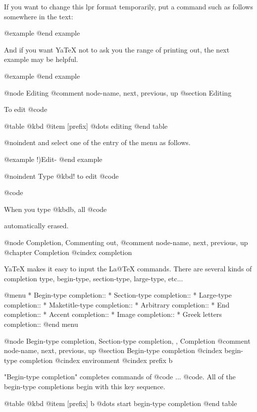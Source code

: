 {{{{{{{{{{{{{{{{{  If you want to change this lpr format temporarily, put a command
such as follows somewhere in the text:

@example
@end example

  And if you want YaTeX not to ask you the range of printing
out, the next example may be helpful.

@example
@end example

@node Editing %
@comment  node-name,  next,  previous,  up
@section Editing %

  To edit @code{%

@table @kbd
@item [prefix] %
	@dots{}	editing %
@end table

@noindent
and select one of the entry of the menu as follows.

@example
	!)Edit-%
@end example

@noindent
Type @kbd{!} to edit @code{%
@code{%
When you type @kbd{b}, all @code{%
automatically erased.

@node Completion, Commenting out, %
@comment  node-name,  next,  previous,  up
@chapter Completion
@cindex completion

  YaTeX makes it easy to input the La@TeX{} commands.  There are several
kinds of completion type, begin-type, section-type, large-type, etc...

@menu
* Begin-type completion::       
* Section-type completion::     
* Large-type completion::       
* Maketitle-type completion::   
* Arbitrary completion::        
* End completion::              
* Accent completion::           
* Image completion::            
* Greek letters completion::    
@end menu

@node Begin-type completion, Section-type completion,  , Completion
@comment  node-name,  next,  previous,  up
@section Begin-type completion
@cindex begin-type completion
@cindex environment
@cindex prefix b

  "Begin-type completion" completes commands of @code{} ... 
@code{}.  All of the begin-type completions begin with this key
sequence.

@table @kbd
@item [prefix] b
	@dots{}	start begin-type completion
@end table

}}}}}}}}}}}}}}}}}}}}}

